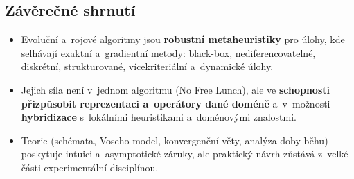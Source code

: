 \documentclass[11pt,a4paper]{article}
\theoremstyle{definition}
\begin{document}
\subsection*{Závěrečné shrnutí}

\begin{itemize}
\item Evoluční a~rojové algoritmy jsou \textbf{robustní metaheuristiky}
  pro úlohy, kde selhávají exaktní a~gradientní metody: black-box,
  nedi\-fe\-ren\-co\-va\-tel\-né, diskrétní, struk\-tu\-ro\-va\-né,
  ví\-ce\-kri\-te\-ri\-ál\-ní a~dynamické úlohy.
\item Jejich síla není v~jednom  algoritmu (No Free Lunch),
  ale ve \textbf{schopnosti přizpůsobit reprezentaci a~operátory dané doméně}
  a~v~možnosti \textbf{hybridizace} s~lokálními heuristikami a~doménovými
  znalostmi.
\item Teorie (schémata, Voseho model, konvergenční věty, analýza doby běhu)
  poskytuje intuici a~a\-sym\-pto\-tic\-ké záruky, ale praktický návrh
  zůstává z~velké části ex\-pe\-ri\-men\-tál\-ní dis\-cip\-lí\-nou.
\end{itemize}
\end{document}
